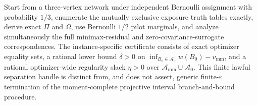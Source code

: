 Start from a three-vertex network under independent Bernoulli assignment with probability \(1/3\), enumerate the mutually exclusive exposure truth tables exactly, derive exact \(\Pi\) and \(\Omega\), use Bernoulli \(1/2\) pilot marginals, and analyze simultaneously the full minimax-residual and zero-covariance-surrogate correspondences.  The instance-specific certificate consists of exact optimizer equality sets, a rational lower bound \(\delta>0\) on \(\inf_{B_0\in\mathcal A_0}w(B_0)-v_{\mathrm{mm}}\), and a rational optimizer-wide regularity slack \(\eta>0\) over \(\mathcal A_{\mathrm{mm}}\cup\mathcal A_0\).  This finite lawful separation handle is distinct from, and does not assert, generic finite-\(\varepsilon\) termination of the moment-complete projective interval branch-and-bound procedure.